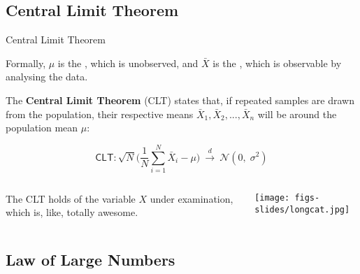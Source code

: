 \documentclass{beamer}
\begin{document}

	
	\subsection{Central Limit Theorem}
		
	\begin{frame}[t]{Central Limit Theorem}

	Formally, $\mu$ is the , which is unobserved, and $\bar{X}$ is the , which is observable by analysing the data.\vspace{1em}

The \textbf{Central Limit Theorem} (CLT) states that, if repeated samples are drawn from the population, their respective means $\bar X_1, \bar X_2,... , \bar X_n$ will be  around the population mean $\mu$:

		$$\textsf{CLT}: \sqrt{N}\bigg(\frac{1}{N}\sum_{i=1}^N \bar X_i - \mu\bigg)\ \xrightarrow{d}\ \mathcal{N}(0,\;\sigma^2)$$
		
		\vspace{1em}
		\begin{columns}[T]
		The CLT holds  of the variable $X$ under examination, which is, like, totally awesome.
		\vspace{1.5em}
		\begin{flushright}
		\texttt{[image: figs-slides/longcat.jpg]}		
		\end{flushright}
		\end{columns}
	\end{frame}

	
	\subsection{Law of Large Numbers}
\end{document}
